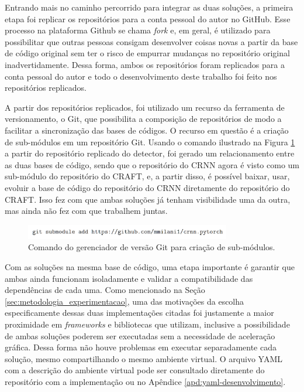 Entrando mais no caminho percorrido para integrar as duas soluções, a primeira etapa foi replicar os repositórios para a conta pessoal do autor no GitHub. 
Esse processo na plataforma Github se chama \textit{fork} e, em geral, é utilizado para possibilitar que outras pessoas consigam desenvolver coisas 
novas a partir da base de código original sem ter o risco de empurrar mudanças no repositório original inadvertidamente. Dessa forma, ambos os repositórios 
foram replicados para a conta pessoal do autor e todo o desenvolvimento deste trabalho foi feito nos repositórios replicados.

A partir dos repositórios replicados, foi utilizado um recurso da ferramenta de versionamento, o Git, que possibilita a composição de repositórios de modo 
a facilitar a sincronização das bases de códigos. O recurso em questão é a criação de sub-módulos em um repositório Git. Usando o comando ilustrado na Figura \ref{fig:methodology_git_submodule} a partir 
do repositório replicado do detector, foi gerado um relacionamento entre as duas bases de código, sendo que o repositório do CRNN agora é visto como um 
sub-módulo do repositório do CRAFT, e, a partir disso, é possível baixar, usar, evoluir a base de código do repositório do CRNN diretamente do repositório 
do CRAFT. Isso fez com que ambas soluções já tenham visibilidade uma da outra, mas ainda não fez com que trabalhem juntas.

\begin{figure}
    \centering
    \includegraphics[width=0.8\textwidth]{figs/git-submodule.png}
    \caption{Comando do gerenciador de versão Git para criação de sub-módulos.}
    \label{fig:methodology_git_submodule}
\end{figure}

Com as soluções na mesma base de código, uma etapa importante é garantir que ambas ainda funcionam isoladamente e validar a compatibilidade das dependências 
de cada uma. Como mencionado na Seção \ref{sec:metodologia_experimentacao}, uma das motivações da escolha especificamente dessas duas implementações citadas foi 
justamente a maior proximidade em \textit{frameworks} e bibliotecas que utilizam, inclusive a possibilidade de ambas soluções poderem ser executadas sem a 
necessidade de aceleração gráfica. Dessa forma não houve problemas em executar separadamente cada solução, mesmo compartilhando o mesmo ambiente virtual. 
O arquivo YAML com a descrição do ambiente virtual pode ser consultado diretamente do repositório com a implementação ou no Apêndice \ref{apd:yaml-desenvolvimento}.


